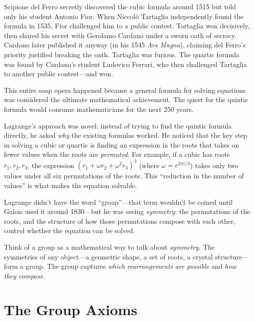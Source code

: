 \documentclass[11pt, a4paper, oneside]{book}
\begin{document}
\begin{historical}[title={The Italian Algebraists}]
Scipione del Ferro secretly discovered the cubic formula around 1515 but told
only his student Antonio Fior. When Niccolò Tartaglia independently found the
formula in 1535, Fior challenged him to a public contest. Tartaglia won
decisively, then shared his secret with Gerolamo Cardano under a sworn oath of
secrecy. Cardano later published it anyway (in his 1545 \textit{Ars Magna}),
claiming del Ferro's priority justified breaking the oath. Tartaglia was
furious. The quartic formula was found by Cardano's student Ludovico Ferrari,
who then challenged Tartaglia to another public contest---and won.

This entire soap opera happened because a general formula for solving equations
was considered the ultimate mathematical achievement. The quest for the quintic
formula would consume mathematicians for the next 250 years.
\end{historical}

Lagrange's approach was novel: instead of trying to find the quintic formula
directly, he asked \emph{why} the existing formulas worked. He noticed that
the key step in solving a cubic or quartic is finding an expression in the
roots that takes on fewer values when the roots are \emph{permuted}. For
example, if a cubic has roots $r_1, r_2, r_3$, the expression
$(r_1 + \omega r_2 + \omega^2 r_3)^3$ (where $\omega = e^{2\pi i/3}$) takes
only two values under all six permutations of the roots. This ``reduction
in the number of values'' is what makes the equation solvable.

Lagrange didn't have the word ``group''---that term wouldn't be coined until
Galois used it around 1830---but he was seeing \emph{symmetry}: the permutations
of the roots, and the structure of how those permutations compose with each
other, control whether the equation can be solved.

\begin{intuition}
Think of a group as a mathematical way to talk about \emph{symmetry}. The
symmetries of any object---a geometric shape, a set of roots, a crystal
structure---form a group. The group captures \emph{which rearrangements are
possible} and \emph{how they compose}.
\end{intuition}

\section{The Group Axioms}
\end{document}
